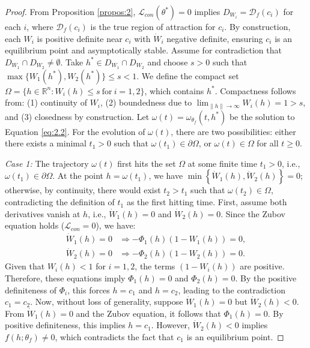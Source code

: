 \documentclass[journal]{IEEEtran}
\begin{document}
{\begin{proof}
	From Proposition \ref{propos:2}, $\mathcal{L}_{con}(\theta^*) = 0$ implies $D_{W_i} = \mathcal{D}_{f}(c_i)$ for each $i$, where $\mathcal{D}_{f}(c_i)$ is the true region of attraction for $c_i$. By construction, each $W_i$ is positive definite near $c_i$ with $\dot{W}_i$ negative definite, ensuring $c_i$ is an equilibrium point and asymptotically stable.
	Assume for contradiction that $D_{W_1} \cap D_{W_2} \neq \emptyset$. Take $h^* \in D_{W_1} \cap D_{W_2}$ and choose $s > 0$ such that $\max\{W_1(h^*), W_2(h^*)\} \leq s < 1$. We define the compact set $\Omega = \{ h \in \mathbb{R}^n : W_i(h) \leq s \ \text{for}\ i=1,2 \}$, which contains $h^*$. Compactness follows from: (1) continuity of $W_i$, (2) boundedness due to $\lim_{\|h\|\to\infty} W_i(h) = 1 > s$, and (3) closedness by construction. Let $\omega(t) = \omega_{\theta_f}(t, h^*)$ be the solution to Equation \eqref{eq:2.2}. For the evolution of \(\omega(t)\), there are two possibilities: either there exists a minimal \(t_1 > 0\) such that \(\omega(t_1) \in \partial\Omega\), or \(\omega(t) \in \Omega\) for all \(t \ge 0\).
	
	\textit{Case 1:} The trajectory $\omega(t)$ first hits the set $\Omega$ at some finite time $t_1 > 0$, i.e., $\omega(t_1) \in \partial \Omega$. At the point $h = \omega(t_1)$, we have $\min \left\{ \dot{W}_1(h), \dot{W}_2(h) \right\} = 0$; otherwise, by continuity, there would exist $t_2 > t_1$ such that $\omega(t_2) \in \Omega$, contradicting the definition of $t_1$ as the first hitting time.
	First, assume both derivatives vanish at $h$, i.e., $\dot{W}_1(h) = 0$ and $\dot{W}_2(h) = 0$. Since the Zubov equation holds ($\mathcal{L}_{con} = 0$), we have:
	\begin{align*}
		\dot{W}_1(h) = 0 &\Rightarrow -\Phi_1(h)(1 - W_1(h)) = 0, \\
		\dot{W}_2(h) = 0 &\Rightarrow -\Phi_2(h)(1 - W_2(h)) = 0.
	\end{align*}
	Given that $W_i(h) < 1$ for $i = 1, 2$, the terms $(1 - W_i(h))$ are positive. Therefore, these equations imply $\Phi_1(h) = 0$ and $\Phi_2(h) = 0$. By the positive definiteness of $\Phi_i$, this forces $h = c_1$ and $h = c_2$, leading to the contradiction $c_1 = c_2$.
	Now, without loss of generality, suppose $\dot{W}_1(h) = 0$ but $\dot{W}_2(h) < 0$. From $\dot{W}_1(h) = 0$ and the Zubov equation, it follows that $\Phi_1(h) = 0$. By positive definiteness, this implies $h = c_1$. However, $\dot{W}_2(h) < 0$ implies $f(h; \theta_f) \neq 0$, which contradicts the fact that $c_1$ is an equilibrium point.
	


\end{proof}}
\end{document}
